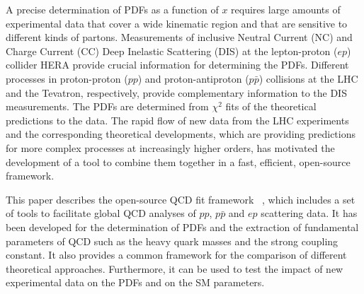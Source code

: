A precise determination of PDFs as a function of $x$ requires large amounts of
experimental data that cover a wide kinematic region and that are sensitive to different kinds of partons. Measurements of inclusive Neutral Current (NC) and Charge Current (CC) Deep Inelastic Scattering (DIS) at the lepton-proton ($ep$) collider HERA provide crucial information for determining the PDFs. Different processes in  proton-proton ($pp$) and proton-antiproton ($p \bar p$) collisions at the LHC and the Tevatron, respectively, 
provide complementary information to the DIS measurements.
 The PDFs are determined
from $\chi^2$ fits of the theoretical predictions to the 
data. 
The rapid flow of new data from the LHC experiments and the corresponding theoretical developments, which are providing predictions for more complex processes at increasingly higher orders, has motivated the development of a tool to combine them  together in a fast, efficient, open-source framework.
%

This paper describes the open-source QCD fit framework \fitter~\cite{herafitter:page}, which includes a set of tools to facilitate global 
QCD analyses of $pp$, $p\bar{p}$ and $ep$ scattering data. 
It has been developed for the determination of PDFs and the extraction of fundamental parameters of QCD such as the heavy
quark masses and the strong coupling constant. It also provides a common framework for the
comparison of different theoretical approaches. Furthermore, it can be used to test the impact 
of new experimental data on the PDFs and on the SM parameters.

